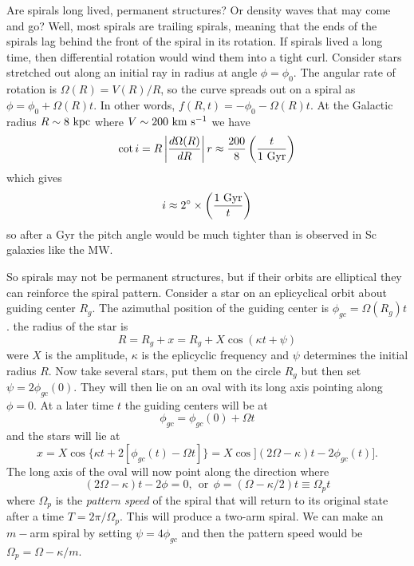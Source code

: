 \documentclass[]{article}
\begin{document}
Are spirals long lived, permanent structures?  Or density waves that may come and go?
Well, most spirals are trailing spirals, meaning that the ends of the spirals lag behind
the front of the spiral in its rotation.  If spirals lived a long time, then differential
rotation would wind them into a tight curl.  Consider stars stretched out along an
initial ray in radius at angle $\phi = \phi_0$.  The angular rate of rotation is
$\Omega(R) = V(R)/R$, so the curve spreads out on a spiral as $\phi = \phi_0 + \Omega(R)t$.
In other words, $f(R,t) = -\phi_0 - \Omega(R)t$.  At the Galactic radius $R\sim8~\mathrm{kpc}$
where $V\sim200~\mathrm{km}~\mathrm{s}^{-1}$ we have
\begin{equation}
\cot i = R \left| \frac{d\Omega(R)}{dR}\right| r \approx \frac{200}{8}\left(\frac{t}{1~\mathrm{Gyr}}\right)
\end{equation}
\noindent
which gives
\begin{equation}
i\approx2^\circ \times \left(\frac{1~\mathrm{Gyr}}{t}\right)
\end{equation}
\noindent
so after a Gyr the pitch angle would be much tighter than is observed in Sc galaxies like the MW.

So spirals may not be permanent structures, but if their orbits are elliptical they can 
reinforce the spiral pattern.  Consider a star on an eplicyclical orbit about guiding
center $R_g$.  The azimuthal position of the guiding center is $\phi_{gc} = \Omega(R_g)t$.
the radius of the star is
\begin{equation}
R = R_g + x = R_g + X \cos(\kappa t + \psi)
\end{equation}
\noindent
were $X$ is the amplitude, $\kappa$ is the eplicyclic frequency and $\psi$ determines the initial
radius $R$.  Now take several stars, put them on the circle $R_g$ but then set $\psi = 2\phi_{gc}(0)$.
They will then lie on an oval with its long axis pointing along $\phi = 0$. At a later time $t$
the guiding centers will be at
\begin{equation}
\phi_{gc} = \phi_{gc}(0) + \Omega t
\end{equation}
\noindent
and the stars will lie at
\begin{equation}
x = X\cos\{\kappa t + 2[\phi_{gc}(t) - \Omega t]\} = X \cos](2\Omega-\kappa)t - 2\phi_{gc}(t)].
\end{equation}
The long axis of the oval will now point along the direction where
\begin{equation}
(2\Omega-\kappa)t - 2\phi = 0,~~\mathrm{or}~~\phi=(\Omega-\kappa/2) t \equiv \Omega_p t
\end{equation}
\noindent
where $\Omega_p$ is the {\it pattern speed} of the spiral that will return to its original state after a time $T = 2\pi/\Omega_p$.
This will produce a two-arm spiral.  We can make an $m-$arm spiral by setting $\psi = 4\phi_{gc}$ and 
then the pattern speed would be $\Omega_p = \Omega - \kappa/m$.
\end{document}
